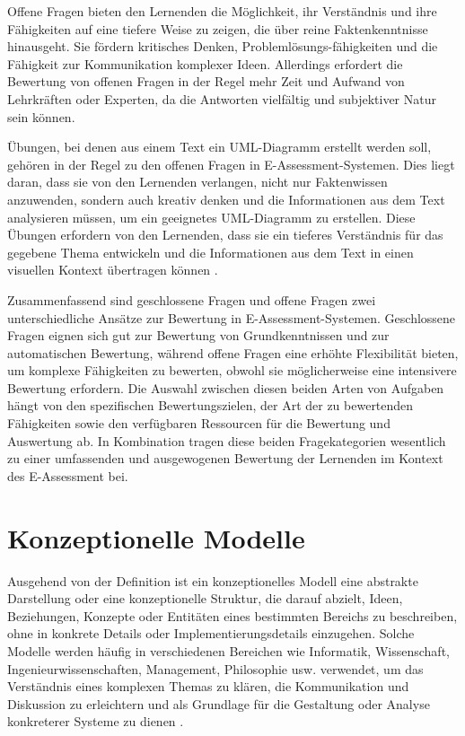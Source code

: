 Offene Fragen bieten den Lernenden die Möglichkeit, ihr Verständnis und ihre Fähigkeiten auf eine tiefere Weise zu zeigen, die über reine Faktenkenntnisse hinausgeht. Sie fördern kritisches Denken, Problemlösungs-fähigkeiten und die Fähigkeit zur Kommunikation komplexer Ideen. Allerdings erfordert die Bewertung von offenen Fragen in der Regel mehr Zeit und Aufwand von Lehrkräften oder Experten, da die Antworten vielfältig und subjektiver Natur sein können.


Übungen, bei denen aus einem Text ein \ac{UML}-Diagramm erstellt werden soll, gehören in der Regel zu den offenen Fragen in E-Assessment-Systemen. Dies liegt daran, dass sie von den Lernenden verlangen, nicht nur Faktenwissen anzuwenden, sondern auch kreativ denken und die Informationen aus dem Text analysieren müssen, um ein geeignetes \ac{UML}-Diagramm zu erstellen.  Diese Übungen erfordern von den Lernenden, dass sie ein tieferes Verständnis für das gegebene Thema entwickeln und die Informationen aus dem Text in einen visuellen Kontext übertragen können \cite{ullrich2021automated}.

Zusammenfassend sind geschlossene Fragen und offene Fragen zwei unterschiedliche Ansätze zur Bewertung in E-Assessment-Systemen. Geschlossene Fragen eignen sich gut zur Bewertung von Grundkenntnissen und zur automatischen Bewertung, während offene Fragen eine erhöhte Flexibilität bieten, um komplexe Fähigkeiten zu bewerten, obwohl sie möglicherweise eine intensivere Bewertung erfordern. Die Auswahl zwischen diesen beiden Arten von Aufgaben hängt von den spezifischen Bewertungszielen, der Art der zu bewertenden Fähigkeiten sowie den verfügbaren Ressourcen für die Bewertung und Auswertung ab. In Kombination tragen diese beiden Fragekategorien wesentlich zu einer umfassenden und ausgewogenen Bewertung der Lernenden im Kontext des E-Assessment bei.


\section{Konzeptionelle Modelle}
Ausgehend von der Definition ist ein konzeptionelles Modell eine abstrakte Darstellung oder eine konzeptionelle Struktur, die darauf abzielt, Ideen, Beziehungen, Konzepte oder Entitäten eines bestimmten Bereichs zu beschreiben, ohne in konkrete Details oder Implementierungsdetails einzugehen. Solche Modelle werden häufig in verschiedenen Bereichen wie Informatik, Wissenschaft, Ingenieurwissenschaften, Management, Philosophie usw. verwendet, um das Verständnis eines komplexen Themas zu klären, die Kommunikation und Diskussion zu erleichtern und als Grundlage für die Gestaltung oder Analyse konkreterer Systeme zu dienen \cite{abramowicz2013business}.

